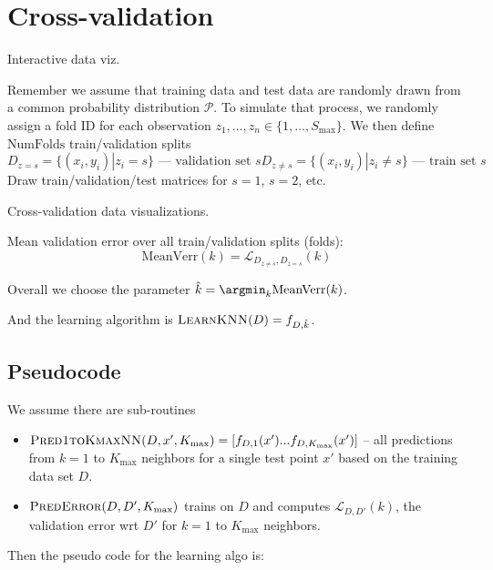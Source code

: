 \documentclass{article}
\begin{document}
\section{Cross-validation}

Interactive data viz.

Remember we assume that training data and test data are randomly drawn
from a common probability distribution $\mathcal P$. To simulate that
process, we randomly assign a fold ID for each observation
$z_1,\dots,z_n\in\{1,\dots, S_\text{max}\}$. We then define
$\text{NumFolds}$ train/validation splits
\begin{equation}
  D_{z=s} = \{(x_i,y_i)|z_i = s\} \text{ --- validation set $s$}
  D_{z\neq s} = \{(x_i,y_i)|z_i \neq s\} \text{ --- train set $s$}
\end{equation}
Draw train/validation/test matrices for $s=1$, $s=2$, etc.

Cross-validation data visualizations.

Mean validation error over all train/validation splits (folds):
\begin{equation}
  \text{MeanVerr}(k) = \mathcal L_{D_{z\neq s},D_{z=s}}(k)
\end{equation}

Overall we choose the parameter $\hat k = \argmin_k \text{MeanVerr}(k)$.

And the learning algorithm is $\textsc{LearnKNN}(D) = f_{D, \hat k}$.

\subsection{Pseudocode}

We assume there are sub-routines
\begin{itemize}
\item
  $\textsc{Pred1toKmaxNN}(D, x', K_{\text{max}}) = [ f_{D, 1}(x')
  ... f_{D, K_{\text{max}}}(x') ]$ -- all predictions from $k=1$ to
  $K_{\text{max}}$ neighbors for a single test point $x'$ based on the training
  data set $D$.
\item $\textsc{PredError}(D, D', K_{\text{max}})$ trains on $D$ and
  computes $\mathcal L_{D,D'}(k)$, the validation error wrt $D'$ for
  $k=1$ to $K_{\text{max}}$ neighbors.
\end{itemize}

Then the pseudo code for the learning algo is:
\end{document}
